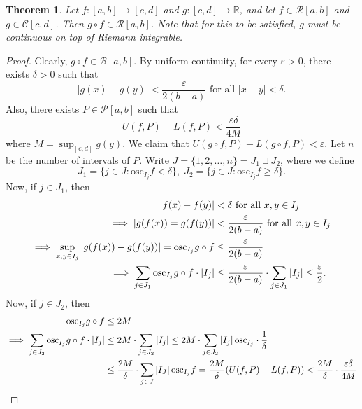 \documentclass[15pt,a4paper]{book}
\newtheorem{theorem}{Theorem}[chapter]
\theoremstyle{definition}
\newcommand{\abs}[1]{\left| #1 \right|} %
\newcommand{\R}{\mathbb{R}} %
\newcommand{\cP}{\mathcal{P}}
\newcommand{\cR}{\mathcal{R}}
\newcommand{\cB}{\mathcal{B}}
\newcommand{\cC}{\mathcal{C}}
\newcommand{\osc}{\text{osc}}
\begin{document}
\begin{enumerate}
\begin{theorem}
    Let $f:[a,b] \to [c,d]$ and $g:[c,d] \to \R$, and let $f \in \cR[a,b]$ and $g \in \cC[c,d]$. Then $g \circ f \in \cR[a,b]$. Note that for this to be satisfied, $g$ must be continuous on top of Riemann integrable.
\end{theorem}
\begin{proof}
    Clearly, $g \circ f \in \cB[a,b]$. By uniform continuity, for every $\varepsilon > 0$, there exists $\delta > 0$ such that
    \begin{equation}
        \abs{g(x)-g(y)} < \frac{\varepsilon}{2(b-a)} \text{ for all } \abs{x-y} < \delta.
    \end{equation}
    Also, there exists $P \in \cP[a,b]$ such that
    \begin{equation}
        U(f,P) - L(f,P) < \frac{\varepsilon \delta}{4M}
    \end{equation}
    where $M = \sup_{[c,d]} g(y)$. We claim that $U(g \circ f, P) - L(g \circ f, P) < \varepsilon$. Let $n$ be the number of intervals of $P$. Write $J = \{1,2,\ldots,n\} = J_{1} \sqcup J_{2}$, where we define
    \begin{equation*}
        J_{1} = \{j \in J : \osc_{I_{j}}f < \delta \}, \; J_{2} = \{j \in J : \osc_{I_{j}}f \geq \delta\}.
    \end{equation*}
    Now, if $j \in J_{1}$, then 
    \begin{align}
        \abs{f(x)-f(y)} &< \delta \text{ for all } x,y \in I_{j} \\
        \implies \abs{g(f(x)) = g(f(y))} &< \frac{\varepsilon}{2 (b-a)} \text{ for all } x,y \in I_{j} \notag \\
        \implies \sup_{x,y \in I_{j}} \abs{g(f(x))-g(f(y))} = \osc_{I_{j}} g \circ f &\leq \frac{\varepsilon}{2(b-a)} \notag \\
        \implies \sum_{j \in J_{1}} \osc_{I_{j}} g \circ f \cdot \abs{I_{j}} &\leq \frac{\varepsilon}{2(b-a)} \cdot \sum_{j \in J_{1}} \abs{I_{j}} \leq \frac{\varepsilon}{2}.
    \end{align}
    Now, if $j \in J_{2}$, then
    \begin{align}
        \osc_{I_{j}} g \circ f &\leq 2M \\
        \implies \sum_{j \in J_{2}} \osc_{I_{j}} g \circ f \cdot \abs{I_{j}} &\leq 2M \cdot \sum_{j \in J_{2}} \abs{I_{j}} \leq 2M \cdot \sum_{j \in J_{2}} \abs{I_{j}} \osc_{I_{j}} \cdot \frac{1}{\delta} \notag \\
        &\leq \frac{2M}{\delta} \cdot \sum_{j \in J} \abs{I_{J}} \osc_{I_{j}} f = \frac{2M}{\delta} (U(f,P)-L(f,P)) < \frac{2M}{\delta} \cdot \frac{\varepsilon \delta}{4 M} \\

\end{align}
\end{proof}
\end{enumerate}
\end{document}
